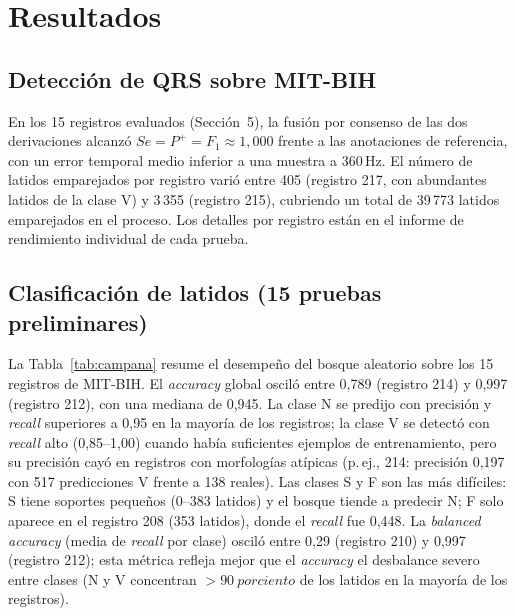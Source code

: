 \section{Resultados}

\subsection{Detección de QRS sobre MIT-BIH}
En los 15 registros evaluados (Sección~5), la fusión por consenso de las
dos derivaciones alcanzó $Se=P^{+}=F_1\approx 1{,}000$ frente a las
anotaciones de referencia, con un error temporal medio inferior a una
muestra a 360\,Hz. El número de latidos emparejados por registro varió
entre 405 (registro 217, con abundantes latidos de la clase V) y 3\,355
(registro 215), cubriendo un total de 39\,773 latidos emparejados en el proceso. Los detalles por registro están en el informe de rendimiento
individual de cada prueba.

\subsection{Clasificación de latidos (15 pruebas preliminares)}
La Tabla~\ref{tab:campana} resume el desempeño del bosque aleatorio
sobre los 15 registros de MIT-BIH. El \emph{accuracy} global osciló
entre 0,789 (registro 214) y 0,997 (registro 212), con una mediana de
0,945. La clase N se predijo con precisión y \emph{recall} superiores a
0,95 en la mayoría de los registros; la clase V se detectó con
\emph{recall} alto (0,85--1,00) cuando había suficientes ejemplos de
entrenamiento, pero su precisión cayó en registros con morfologías
atípicas (p.\,ej., 214: precisión 0,197 con 517 predicciones V frente a
138 reales). Las clases S y F son las más difíciles: S tiene soportes
pequeños (0--383 latidos) y el bosque tiende a predecir N; F solo
aparece en el registro 208 (353 latidos), donde el \emph{recall} fue
0,448. La \emph{balanced accuracy} (media de \emph{recall} por clase)
osciló entre 0,29 (registro 210) y 0,997 (registro 212); esta métrica
refleja mejor que el \emph{accuracy} el desbalance severo entre clases
(N y V concentran $>90\ porciento$ de los latidos en la mayoría de los
registros).

